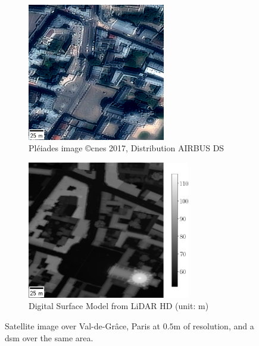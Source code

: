 \begin{figure}
    \centering
    \begin{subfigure}[t]{0.5\linewidth}
        \centering
        \includegraphics[height=6cm]{Images/0_Intro/Paris_Ortho.png}
        \caption{Pléiades image \copyright \acrshort{cnes} 2017, Distribution AIRBUS DS}
        \label{fig:VDG_ortho}
    \end{subfigure}\hfill
    \begin{subfigure}[t]{0.5\linewidth}
        \centering
        \includegraphics[height=6cm]{Images/0_Intro/Paris_DSM.png}
        \caption{Digital Surface Model from LiDAR HD (unit: m)}
        \label{fig:VDG_dsm}
    \end{subfigure}
    \caption{Satellite image over Val-de-Grâce, Paris at $0.5$m of resolution, and a \acrshort{dsm} over the same area.}
    \label{fig:intro_dsm_example}
\end{figure}

